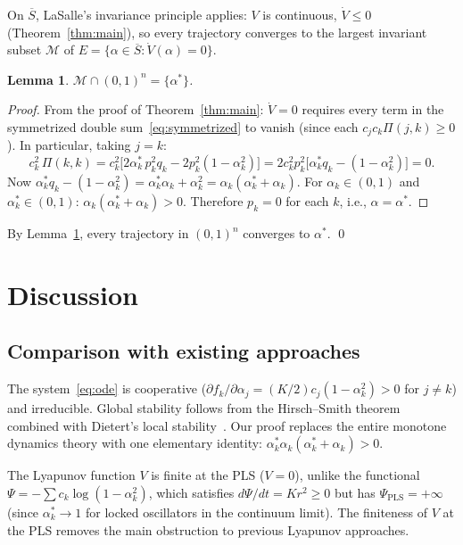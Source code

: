 \documentclass[11pt,a4paper]{article}
\newtheorem{lemma}[theorem]{Lemma}
\theoremstyle{definition}
\begin{document}
On $\overline{S}$, LaSalle's invariance principle applies: $V$ is continuous, $\dot{V} \leq 0$ (Theorem~\ref{thm:main}), so every trajectory converges to the largest invariant subset $\mathcal{M}$ of $E = \{\alpha \in \overline{S} : \dot{V}(\alpha) = 0\}$.

\begin{lemma}\label{lem:invariant}
$\mathcal{M} \cap (0,1)^n = \{\alpha^*\}$.
\end{lemma}

\begin{proof}
From the proof of Theorem~\ref{thm:main}: $\dot{V} = 0$ requires every term in the symmetrized double sum~\eqref{eq:symmetrized} to vanish (since each $c_jc_k\Pi(j,k) \geq 0$). In particular, taking $j = k$:
\[
c_k^2\,\Pi(k,k) = c_k^2\bigl[2\alpha_k^*\,p_k^2 q_k - 2p_k^2(1-\alpha_k^2)\bigr] = 2c_k^2 p_k^2\bigl[\alpha_k^*q_k - (1-\alpha_k^2)\bigr] = 0.
\]
Now $\alpha_k^* q_k - (1-\alpha_k^2) = \alpha_k^*\alpha_k + \alpha_k^2 = \alpha_k(\alpha_k^* + \alpha_k)$. For $\alpha_k \in (0,1)$ and $\alpha_k^* \in (0,1)$: $\alpha_k(\alpha_k^* + \alpha_k) > 0$. Therefore $p_k = 0$ for each $k$, i.e., $\alpha = \alpha^*$.
\end{proof}

By Lemma~\ref{lem:invariant}, every trajectory in $(0,1)^n$ converges to $\alpha^*$. \qed

\section{Discussion}

\subsection{Comparison with existing approaches}

The system~\eqref{eq:ode} is cooperative ($\partial f_k/\partial \alpha_j = (K/2)c_j(1-\alpha_k^2) > 0$ for $j \neq k$) and irreducible. Global stability follows from the Hirsch--Smith theorem~\cite{hirsch1985,smith1995} combined with Dietert's local stability~\cite{dietert2016}. Our proof replaces the entire monotone dynamics theory with one elementary identity: $\alpha_k^*\alpha_k(\alpha_k^*+\alpha_k) > 0$.

The Lyapunov function $V$ is finite at the PLS ($V=0$), unlike the functional $\Psi = -\sum c_k\log(1-\alpha_k^2)$, which satisfies $d\Psi/dt = Kr^2 \geq 0$ but has $\Psi_{\mathrm{PLS}} = +\infty$ (since $\alpha_k^* \to 1$ for locked oscillators in the continuum limit). The finiteness of $V$ at the PLS removes the main obstruction to previous Lyapunov approaches.
\end{document}
